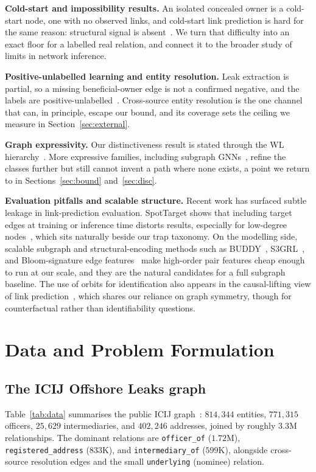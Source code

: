 \documentclass[sigconf]{acmart}
\begin{document}
\textbf{Cold-start and impossibility results.} An isolated concealed owner is a
cold-start node, one with no observed links, and cold-start link prediction is
hard for the same reason: structural signal is absent~\cite{coldstart}. We turn
that difficulty into an exact floor for a labelled real relation, and connect it
to the broader study of limits in network inference.

\textbf{Positive-unlabelled learning and entity resolution.} Leak extraction is
partial, so a missing beneficial-owner edge is not a confirmed negative, and the
labels are positive-unlabelled~\cite{pu}. Cross-source entity resolution is the
one channel that can, in principle, escape our bound, and its coverage sets the
ceiling we measure in Section~\ref{sec:external}.

\textbf{Graph expressivity.} Our distinctiveness result is stated through the WL
hierarchy~\cite{wl,gnnwl}. More expressive families, including subgraph
GNNs~\cite{seal,buddy}, refine the classes further but still cannot invent a path
where none exists, a point we return to in Sections~\ref{sec:bound}
and~\ref{sec:disc}.

\textbf{Evaluation pitfalls and scalable structure.} Recent work has surfaced
subtle leakage in link-prediction evaluation. SpotTarget shows that including
target edges at training or inference time distorts results, especially for
low-degree nodes~\cite{spottarget}, which sits naturally beside our trap
taxonomy. On the modelling side, scalable subgraph and structural-encoding methods
such as BUDDY~\cite{buddy}, S3GRL~\cite{s3grl}, and Bloom-signature edge
features~\cite{bloomsig} make high-order pair features cheap enough to run at our
scale, and they are the natural candidates for a full subgraph baseline. The use
of orbits for identification also appears in the causal-lifting view of link
prediction~\cite{causallift}, which shares our reliance on graph symmetry, though
for counterfactual rather than identifiability questions.

\section{Data and Problem Formulation}\label{sec:data}
\subsection{The ICIJ Offshore Leaks graph}
Table~\ref{tab:data} summarises the public ICIJ graph~\cite{icij}: $814{,}344$
entities, $771{,}315$ officers, $25{,}629$ intermediaries, and $402{,}246$
addresses, joined by roughly $3.3$M relationships. The dominant relations are
\texttt{officer\_of} ($1.72$M), \texttt{registered\_address} ($833$K), and
\texttt{intermediary\_of} ($599$K), alongside cross-source resolution edges and
the small \texttt{underlying} (nominee) relation.
\end{document}
